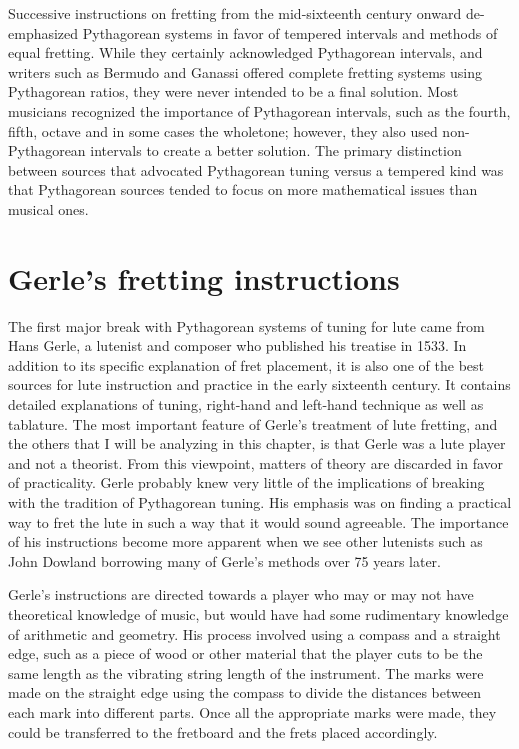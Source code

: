 Successive instructions on fretting from the mid-sixteenth century onward de-emphasized
Pythagorean systems in favor of tempered intervals and methods of equal fretting.
While they certainly acknowledged Pythagorean intervals, and writers such as Bermudo
and Ganassi offered complete fretting systems using Pythagorean ratios, they were never
intended to be a final solution. Most musicians recognized the importance of
Pythagorean intervals, such as the fourth, fifth, octave and in some cases the
wholetone; however, they also used non-Pythagorean intervals to create a better
solution.  The primary distinction between sources that advocated Pythagorean tuning
versus a tempered kind was that Pythagorean sources tended to focus on more
mathematical issues than musical ones.


%
%
\section{Gerle's fretting instructions}

The first major break with Pythagorean systems of tuning for lute came from Hans Gerle, a
lutenist and composer who published his treatise in 1533.  In addition to its specific
explanation of fret placement, it is also one of the best sources for lute instruction and
practice in the early sixteenth century.  It contains detailed explanations of tuning,
right-hand and left-hand technique as well as tablature.  The most important feature of
Gerle's treatment of lute fretting, and the others that I will be analyzing in this
chapter, is that Gerle was a lute player and not a theorist. From this viewpoint, matters
of theory are discarded in favor of practicality.  Gerle probably knew very little of the
implications of breaking with the tradition of Pythagorean tuning.  His emphasis was on
finding a practical way to fret the lute in such a way that it would sound agreeable.  The
importance of his instructions become more apparent when we see other lutenists such as
John Dowland borrowing many of Gerle's methods over 75 years later.

Gerle's instructions are directed towards a player who may or may not have theoretical
knowledge of music, but would have had some rudimentary knowledge of arithmetic and
geometry.  His process involved using a compass and a straight edge, such as a piece of
wood or other material that the player cuts to be the same length as the vibrating string
length of the instrument.  The marks were made on the straight edge using the compass to
divide the distances between each mark into different parts.  Once all the appropriate
marks were made, they could be transferred to the fretboard and the frets placed
accordingly.


